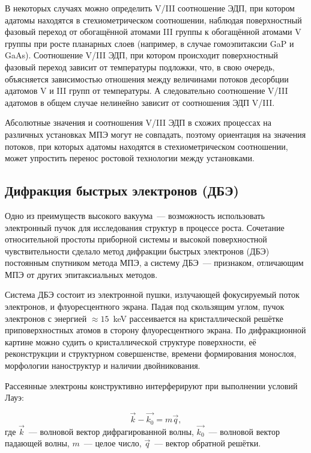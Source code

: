 В некоторых случаях можно определить V/III соотношение ЭДП, при котором адатомы
находятся в стехиометрическом соотношении, наблюдая поверхностный фазовый
переход от обогащённой атомами III группы к обогащённой атомами V группы при
росте планарных слоев (например, в случае гомоэпитаксии GaP и GaAs).
Соотношение V/III ЭДП, при котором происходит поверхностный фазовый переход
зависит от температуры подложки, что, в свою очередь, объясняется зависимостью
отношения между величинами потоков десорбции адатомов V и III групп от
температуры. А следовательно соотношение V/III адатомов в общем случае
нелинейно зависит от соотношения ЭДП V/III.

Абсолютные значения и соотношения V/III ЭДП в схожих процессах на различных
установках МПЭ могут не совпадать, поэтому ориентация на значения потоков, при
которых адатомы находятся в стехиометрическом соотношении, может упростить
перенос ростовой технологии между установками.

\subsection{Дифракция быстрых электронов (ДБЭ)}\label{subsec:ch2/sec1/sub2}

Одно из преимуществ высокого вакуума~--- возможность использовать электронный
пучок для исследования структур в процессе роста. Сочетание относительной
простоты приборной системы и высокой поверхностной чувствительности сделало
метод дифракции быстрых электронов (ДБЭ) постоянным спутником метода МПЭ, а
систему ДБЭ~--- признаком, отличающим МПЭ от других эпитаксиальных методов.

Система ДБЭ состоит из электронной пушки, излучающей фокусируемый поток
электронов, и флуоресцентного экрана. Падая под скользящим углом, пучок
электронов с энергией \(\approx 15\)~\si{\kilo\electronvolt} рассеивается на
кристаллической решётке приповерхностных атомов в сторону флуоресцентного
экрана. По дифракционной картине можно судить о кристаллической структуре
поверхности, её реконструкции и структурном совершенстве, времени формирования
монослоя, морфологии наноструктур и наличии двойникования.

Рассеянные электроны конструктивно интерферируют при выполнении условий Лауэ:

\begin{equation} \label{eq:eq_2} \vec{k} - \vec{k_0} = m\vec{q}, \end{equation}
где \(\vec{k}\)~--- волновой вектор дифрагированной волны, \(\vec{k_0}\)~---
волновой вектор падающей волны, \(m\)~--- целое число, \(\vec{q}\)~--- вектор
обратной решётки.

